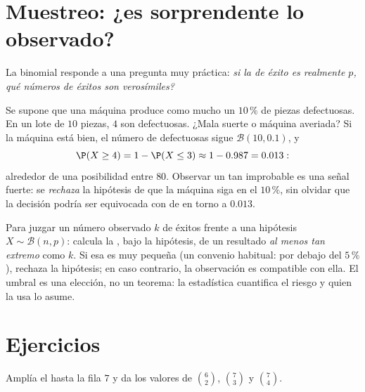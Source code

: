 \section{Muestreo: ¿es sorprendente lo observado?}

La  binomial responde a una pregunta muy práctica: \emph{si la
 de éxito es realmente $p$, qué números de éxitos son
verosímiles?}

\begin{example}\label{ex:g11:binom:decision}
Se supone que una máquina produce como mucho un $10\,\%$ de piezas
defectuosas. En un lote de $10$ piezas, $4$ son defectuosas. ¿Mala suerte
o máquina averiada? Si la máquina está bien, el número de defectuosas
sigue $\mathcal B(10, 0.1)$, y
\[
\P(X \geq 4) = 1 - \P(X \leq 3) \approx 1 - 0.987 = 0.013 :
\]
alrededor de una posibilidad entre $80$. Observar un  tan
improbable es una señal fuerte: se \emph{rechaza} la hipótesis de que la
máquina siga en el $10\,\%$, sin olvidar que la decisión podría ser
equivocada con  de en torno a $0.013$.
\end{example}

\begin{method}\label{met:g11:binom:decision}
Para juzgar un número observado $k$ de éxitos frente a una hipótesis
$X \sim \mathcal B(n, p)$: calcula la , bajo la hipótesis, de
un resultado \emph{al menos tan extremo} como $k$. Si esa  es
muy pequeña (un convenio habitual: por debajo del $5\,\%$), rechaza la
hipótesis; en caso contrario, la observación es compatible con ella. El
umbral es una elección, no un teorema: la estadística cuantifica el
riesgo y quien la usa lo asume.
\end{method}

\section{Ejercicios}

\begin{exercise}[$\star$]\label{exo:g11:binom:1}
Amplía el  hasta la fila $7$ y da los valores de
$\binom62$, $\binom{7}{3}$ y $\binom74$.
\end{exercise}

